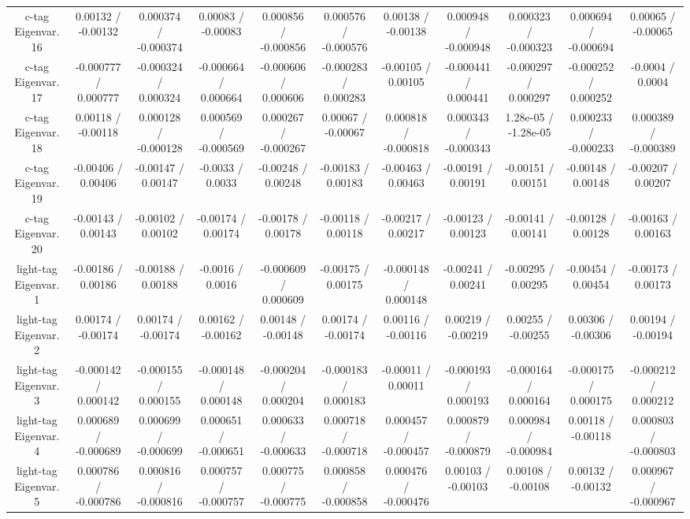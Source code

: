 \begin{table}[htbp]
\begin{center}
\begin{tabular}{|c|c|c|c|c|c|c|c|c|c|c|}
  c-tag Eigenvar. 16 & 0.00132 / -0.00132 & 0.000374 / -0.000374 & 0.00083 / -0.00083 & 0.000856 / -0.000856 & 0.000576 / -0.000576 & 0.00138 / -0.00138 & 0.000948 / -0.000948 & 0.000323 / -0.000323 & 0.000694 / -0.000694 & 0.00065 / -0.00065 \\ 
  c-tag Eigenvar. 17 & -0.000777 / 0.000777 & -0.000324 / 0.000324 & -0.000664 / 0.000664 & -0.000606 / 0.000606 & -0.000283 / 0.000283 & -0.00105 / 0.00105 & -0.000441 / 0.000441 & -0.000297 / 0.000297 & -0.000252 / 0.000252 & -0.0004 / 0.0004 \\ 
  c-tag Eigenvar. 18 & 0.00118 / -0.00118 & 0.000128 / -0.000128 & 0.000569 / -0.000569 & 0.000267 / -0.000267 & 0.00067 / -0.00067 & 0.000818 / -0.000818 & 0.000343 / -0.000343 & 1.28e-05 / -1.28e-05 & 0.000233 / -0.000233 & 0.000389 / -0.000389 \\ 
  c-tag Eigenvar. 19 & -0.00406 / 0.00406 & -0.00147 / 0.00147 & -0.0033 / 0.0033 & -0.00248 / 0.00248 & -0.00183 / 0.00183 & -0.00463 / 0.00463 & -0.00191 / 0.00191 & -0.00151 / 0.00151 & -0.00148 / 0.00148 & -0.00207 / 0.00207 \\ 
  c-tag Eigenvar. 20 & -0.00143 / 0.00143 & -0.00102 / 0.00102 & -0.00174 / 0.00174 & -0.00178 / 0.00178 & -0.00118 / 0.00118 & -0.00217 / 0.00217 & -0.00123 / 0.00123 & -0.00141 / 0.00141 & -0.00128 / 0.00128 & -0.00163 / 0.00163 \\ 
  light-tag Eigenvar. 1 & -0.00186 / 0.00186 & -0.00188 / 0.00188 & -0.0016 / 0.0016 & -0.000609 / 0.000609 & -0.00175 / 0.00175 & -0.000148 / 0.000148 & -0.00241 / 0.00241 & -0.00295 / 0.00295 & -0.00454 / 0.00454 & -0.00173 / 0.00173 \\ 
  light-tag Eigenvar. 2 & 0.00174 / -0.00174 & 0.00174 / -0.00174 & 0.00162 / -0.00162 & 0.00148 / -0.00148 & 0.00174 / -0.00174 & 0.00116 / -0.00116 & 0.00219 / -0.00219 & 0.00255 / -0.00255 & 0.00306 / -0.00306 & 0.00194 / -0.00194 \\ 
  light-tag Eigenvar. 3 & -0.000142 / 0.000142 & -0.000155 / 0.000155 & -0.000148 / 0.000148 & -0.000204 / 0.000204 & -0.000183 / 0.000183 & -0.00011 / 0.00011 & -0.000193 / 0.000193 & -0.000164 / 0.000164 & -0.000175 / 0.000175 & -0.000212 / 0.000212 \\ 
  light-tag Eigenvar. 4 & 0.000689 / -0.000689 & 0.000699 / -0.000699 & 0.000651 / -0.000651 & 0.000633 / -0.000633 & 0.000718 / -0.000718 & 0.000457 / -0.000457 & 0.000879 / -0.000879 & 0.000984 / -0.000984 & 0.00118 / -0.00118 & 0.000803 / -0.000803 \\ 
  light-tag Eigenvar. 5 & 0.000786 / -0.000786 & 0.000816 / -0.000816 & 0.000757 / -0.000757 & 0.000775 / -0.000775 & 0.000858 / -0.000858 & 0.000476 / -0.000476 & 0.00103 / -0.00103 & 0.00108 / -0.00108 & 0.00132 / -0.00132 & 0.000967 / -0.000967 \\ 

\end{tabular}
\end{center}
\end{table}
